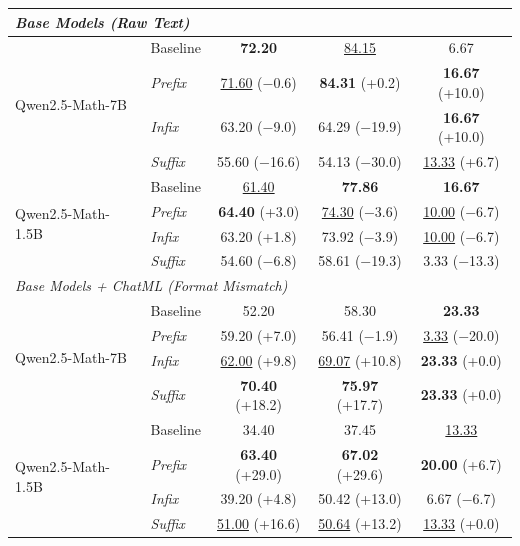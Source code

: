 \begin{table}[H]
\begin{tabular}{ll ccc}
\midrule
\multicolumn{5}{l}{\textit{Base Models (Raw Text)}} \\
\midrule
\multirow{4}{*}{Qwen2.5-Math-7B} & Baseline & \textbf{72.20} & \underline{84.15} & 6.67 \\
 & \emph{Prefix} & \underline{71.60} {\scriptsize($-$0.6)} & \textbf{84.31} {\scriptsize(+0.2)} & \textbf{16.67} {\scriptsize(+10.0)} \\
 & \emph{Infix} & 63.20 {\scriptsize($-$9.0)} & 64.29 {\scriptsize($-$19.9)} & \textbf{16.67} {\scriptsize(+10.0)} \\
 & \emph{Suffix} & 55.60 {\scriptsize($-$16.6)} & 54.13 {\scriptsize($-$30.0)} & \underline{13.33} {\scriptsize(+6.7)} \\
\midrule
\multirow{4}{*}{Qwen2.5-Math-1.5B} & Baseline & \underline{61.40} & \textbf{77.86} & \textbf{16.67} \\
 & \emph{Prefix} & \textbf{64.40} {\scriptsize(+3.0)} & \underline{74.30} {\scriptsize($-$3.6)} & \underline{10.00} {\scriptsize($-$6.7)} \\
 & \emph{Infix} & 63.20 {\scriptsize(+1.8)} & 73.92 {\scriptsize($-$3.9)} & \underline{10.00} {\scriptsize($-$6.7)} \\
 & \emph{Suffix} & 54.60 {\scriptsize($-$6.8)} & 58.61 {\scriptsize($-$19.3)} & 3.33 {\scriptsize($-$13.3)} \\
\midrule
\multicolumn{5}{l}{\textit{Base Models + ChatML (Format Mismatch)}} \\
\midrule
\multirow{4}{*}{Qwen2.5-Math-7B} & Baseline & 52.20 & 58.30 & \textbf{23.33} \\
 & \emph{Prefix} & 59.20 {\scriptsize(+7.0)} & 56.41 {\scriptsize($-$1.9)} & \underline{3.33} {\scriptsize($-$20.0)} \\
 & \emph{Infix} & \underline{62.00} {\scriptsize(+9.8)} & \underline{69.07} {\scriptsize(+10.8)} & \textbf{23.33} {\scriptsize(+0.0)} \\
 & \emph{Suffix} & \textbf{70.40} {\scriptsize(+18.2)} & \textbf{75.97} {\scriptsize(+17.7)} & \textbf{23.33} {\scriptsize(+0.0)} \\
\midrule
\multirow{4}{*}{Qwen2.5-Math-1.5B} & Baseline & 34.40 & 37.45 & \underline{13.33} \\
 & \emph{Prefix} & \textbf{63.40} {\scriptsize(+29.0)} & \textbf{67.02} {\scriptsize(+29.6)} & \textbf{20.00} {\scriptsize(+6.7)} \\
 & \emph{Infix} & 39.20 {\scriptsize(+4.8)} & 50.42 {\scriptsize(+13.0)} & 6.67 {\scriptsize($-$6.7)} \\
 & \emph{Suffix} & \underline{51.00} {\scriptsize(+16.6)} & \underline{50.64} {\scriptsize(+13.2)} & \underline{13.33} {\scriptsize(+0.0)} \\
\bottomrule
\end{tabular}
\end{table}

